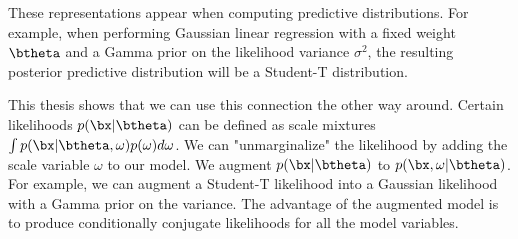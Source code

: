These representations appear when computing predictive distributions.
For example, when performing Gaussian linear regression with a fixed weight $\btheta$ and a Gamma prior on the likelihood variance $\sigma^2$, the resulting posterior predictive distribution will be a Student-T distribution.

This thesis shows that we can use this connection the other way around.
Certain likelihoods $p(\bx|\btheta)$ can be defined as scale mixtures $\int p(\bx|\btheta, \omega)p(\omega)d\omega$.
We can "unmarginalize" the likelihood by adding the scale variable $\omega$ to our model.
We  augment $p(\bx|\btheta)$ to $p(\bx,\omega|\btheta)$.
For example, we can augment a Student-T likelihood into a Gaussian likelihood with a Gamma prior on the variance.
The advantage of the augmented model is to produce conditionally conjugate likelihoods for all the model variables.

